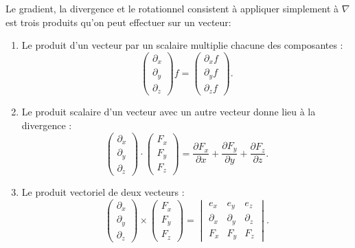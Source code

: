 Le gradient, la divergence et le rotationnel consistent à appliquer simplement à $\nabla$ est trois produits qu'on peut effectuer sur un vecteur:
\begin{enumerate}
    \item
        Le produit d'un vecteur par un scalaire multiplie chacune des composantes :
        \begin{equation}
            \begin{pmatrix}
                \partial_x    \\
                \partial_y    \\
                \partial_z
            \end{pmatrix}f
            =\begin{pmatrix}
                \partial_xf    \\
                \partial_yf    \\
                \partial_zf
            \end{pmatrix}.
        \end{equation}
    \item
        Le produit scalaire d'un vecteur avec un autre vecteur donne lieu à la divergence :
        \begin{equation}
            \begin{pmatrix}
                \partial_x    \\
                \partial_y    \\
                \partial_z
            \end{pmatrix}\cdot
            \begin{pmatrix}
                F_x    \\
                F_y    \\
                F_z
            \end{pmatrix}=
            \frac{ \partial F_x }{ \partial x }+\frac{ \partial F_y }{ \partial y }+\frac{ \partial F_z }{ \partial z }.
        \end{equation}
    \item
        Le produit vectoriel de deux vecteurs :
        \begin{equation}
            \begin{pmatrix}
                \partial_x    \\
                \partial_y    \\
                \partial_z
            \end{pmatrix}\times\begin{pmatrix}
                F_x    \\
                F_y    \\
                F_z
            \end{pmatrix}=
            \begin{vmatrix}
                e_x    &   e_y    &   e_z    \\
                \partial_x    &   \partial_y    &   \partial_z    \\
                F_x    &   F_y    &   F_z
            \end{vmatrix}.
        \end{equation}
\end{enumerate}
